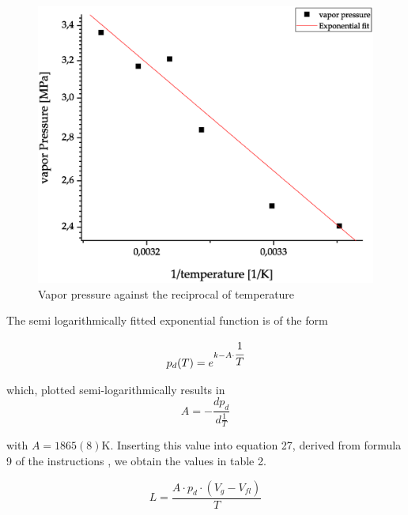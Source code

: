 \documentclass[10pt,a4paper]{article}
\begin{document}
\begin{figure}[hbt!]
\includegraphics[width=400pt, center]{exponentialFit.eps}
\caption{Vapor pressure against the reciprocal of temperature}
\label{fig:length_eight_mouse}
\end{figure}

The semi logarithmically fitted exponential function is of the form

\begin{align}
p_d(T) = e^{k -A \cdot \cfrac{1}{T}}
\end{align}

which, plotted semi-logarithmically results in
\begin{equation}
A = -\frac{dp_d}{d\frac{1}{T}}
\end{equation}

with $A = 1865(8)$K. Inserting this value into equation 27, derived from formula 9 of the instructions \cite{instructions}, we obtain the values in table 2.

\begin{equation}
L = \frac{A \cdot p_d \cdot (V_g - V_{fl})}{T}
\end{equation}
\end{document}
